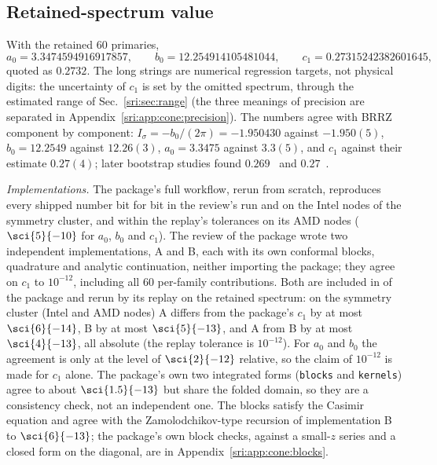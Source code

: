 \subsection{Retained-spectrum value}\label{sri:sec:retained}
With the retained 60 primaries,
\begin{equation}
 a_0=3.3474594916917857,\qquad b_0=12.254914105481044,\qquad c_1=0.27315242382601645,
\end{equation}
quoted as $0.2732$. The long strings are numerical regression targets, not physical digits: the uncertainty of $c_1$ is
set by the omitted spectrum, through the estimated range of Sec.~\ref{sri:sec:range} (the three meanings of precision
are separated in Appendix~\ref{sri:app:cone:precision}). The numbers agree with
BRRZ~\cite{sri:Behan:2017dwr,sri:Behan:2017emf} component by component: $I_\sigma=-b_0/(2\pi)=-1.950430$ against $-1.950(5)$,
$b_0=12.2549$ against $12.26(3)$, $a_0=3.3475$ against $3.3(5)$, and $c_1$ against their estimate $0.27(4)$; later
bootstrap studies found $0.269$~\cite{sri:Behan:2018hfx} and $0.27$~\cite{sri:Behan:2023ile}.

\emph{Implementations.} The package's full workflow, rerun from scratch, reproduces every shipped number bit for bit in
the review's run and on the Intel nodes of the symmetry cluster, and within the replay's tolerances on its AMD nodes
($\sci{5}{-10}$ for $a_0$, $b_0$ and $c_1$). The review of the package wrote two independent implementations, A and B,
each with its own conformal blocks, quadrature and analytic continuation, neither importing the package; they agree on
$c_1$ to $10^{-12}$, including all 60 per-family contributions. Both are included in  of the package
and rerun by its replay on the retained spectrum: on the symmetry cluster (Intel and AMD nodes) A differs from the
package's $c_1$ by at most $\sci{6}{-14}$, B by at most $\sci{5}{-13}$, and A from B by at most $\sci{4}{-13}$, all
absolute (the replay tolerance is $10^{-12}$). For $a_0$ and $b_0$ the agreement is only at the level of
$\sci{2}{-12}$ relative, so the claim of $10^{-12}$ is made for $c_1$ alone. The package's own two integrated forms
(\texttt{blocks} and \texttt{kernels}) agree to about $\sci{1.5}{-13}$ but share the folded domain, so they are a
consistency check, not an independent one. The blocks satisfy the Casimir equation and agree with the
Zamolodchikov-type recursion of implementation B to $\sci{6}{-13}$; the package's own block checks, against a small-$z$
series and a closed form on the diagonal, are in Appendix~\ref{sri:app:cone:blocks}.

